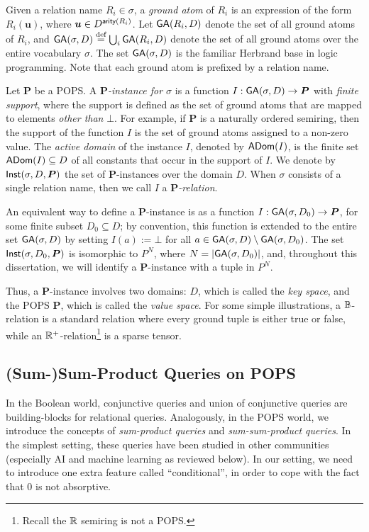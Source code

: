 Given a relation name $R_i \in \sigma$, a {\em ground atom} of $R_i$
is an expression of the form $R_i(\bm u)$, where
$\bm u \in D^{\textsf{arity}(R_i)}$.  Let $\textsf{GA}(R_i,D)$ denote the set of
all ground atoms of $R_i$, and
$\textsf{GA}(\sigma, D) \stackrel{\text{def}}{=} \bigcup_i \textsf{GA}(R_i,D)$ denote the set of
all ground atoms over the entire vocabulary $\sigma$.  The set
$\textsf{GA}(\sigma, D)$ is the familiar Herbrand base in logic
programming.  Note that each ground atom is prefixed by a relation
name.

Let $\bm P$ be a POPS.  A {\em $\bm P$-instance for $\sigma$} is a function
$I : \textsf{GA}(\sigma, D) \rightarrow \bm P$ with {\em finite support},
where the support is defined as the set of ground atoms that are
mapped to elements {\em other than} $\bot$.
For example, if $\bm P$ is a naturally ordered semiring, then the support of the function
$I$ is the set of ground atoms assigned to a non-zero value.
The {\em active domain} of the instance $I$,
denoted by $\textsf{ADom}(I)$, is the finite set $\textsf{ADom}(I) \subseteq D$ of all constants that occur
in the support of $I$.  We denote by $\textsf{Inst}(\sigma, D, \bm P)$ the set
of $\bm P$-instances over the domain $D$.  When $\sigma$ consists of a
single relation name, then we call $I$ a {\em $\bm P$-relation}.

An equivalent way to define a $\bm P$-instance is as a function
$I : \textsf{GA}(\sigma, D_0) \rightarrow \bm P$, for some finite subset
$D_0 \subseteq D$; by convention, this function is extended to the
entire set $\textsf{GA}(\sigma, D)$ by setting $I(a) := \bot$ for all
$a \in \textsf{GA}(\sigma,D) \setminus \textsf{GA}(\sigma,D_0)$.  The set
$\textsf{Inst}(\sigma, D_0, \bm P)$ is isomorphic to $P^N$, where
$N=|\textsf{GA}(\sigma, D_0)|$, and, throughout this dissertation, we will
identify a $\bm P$-instance with a tuple in $P^N$.

Thus, a $\bm P$-instance involves two domains: $D$, which is called
the {\em key space}, and the POPS $\bm P$, which is called the {\em
  value space}.  For some simple illustrations, a $\mathbb B$-relation is a
standard relation where every ground tuple is either true or false,
while an $\mathbb R^+$-relation\footnote{Recall the $\mathbb R$ semiring is not a POPS.} is a sparse tensor.

\subsection{(Sum-)Sum-Product Queries on POPS}
\label{subsec:sum-products}

In the Boolean world, conjunctive queries and union of conjunctive
queries are building-blocks for relational queries.  Analogously, in the POPS world,
we introduce the concepts of {\em sum-product queries} and {\em
  sum-sum-product queries}.
In the simplest setting, these queries
have been studied in other communities (especially AI and machine
learning as reviewed below).  In our setting, we need to introduce one
extra feature called ``conditional'', in order to cope with the fact
that $0$ is not absorptive.

